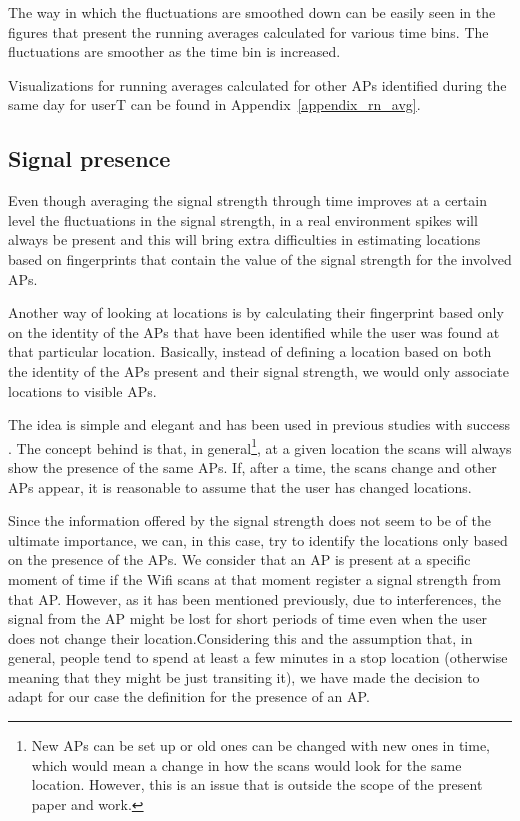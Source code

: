 The way in which the fluctuations are smoothed down can be easily seen in the
figures that present the running averages calculated for various time bins. The
fluctuations are smoother as the time bin is increased.

Visualizations for running averages calculated for other APs identified during
the same day for userT can be found in Appendix~\ref{appendix_rn_avg}.

\subsection{Signal presence}
\label{sig_pres}

Even though averaging the signal strength through time improves at a certain
level the fluctuations in the signal strength, in a real environment spikes will
always be present and this will bring extra difficulties in estimating locations
based on fingerprints that contain the value of the signal strength for the
involved APs.

Another way of looking at locations is by calculating their fingerprint based
only on the identity of the APs that have been identified while the user was
found at that particular location. Basically, instead of defining a location
based on both the identity of the APs present and their signal strength, we
would only associate locations to visible APs.

The idea is simple and elegant and has been used in previous studies with
success \cite{Larsen:2009:MCT:1813042.1813063}. The concept behind is that, in
general\footnote{New APs can be set up or old ones can be changed with new ones
in time, which would mean a change in how the scans would look for the same
location. However, this is an issue that is outside the scope of the present
paper and work.}, at a given location the scans will always show the presence of
the same APs. If, after a time, the scans change and other APs appear, it is
reasonable to assume that the user has changed locations.

Since the information offered by the signal strength does not seem to be of the
ultimate importance, we can, in this case, try to identify the locations only
based on the presence of the APs. We consider that an AP is present at a
specific moment of time if the Wifi scans at that moment register a signal
strength from that AP. However, as it has been mentioned previously, due to
interferences, the signal from the AP might be lost for short periods of time
even when the user does not change their location.Considering this and the
assumption that, in general, people tend to spend at least a few minutes in a
stop location (otherwise meaning that they might be just transiting it), we have
made the decision to adapt for our case the definition for the presence of an
AP.

